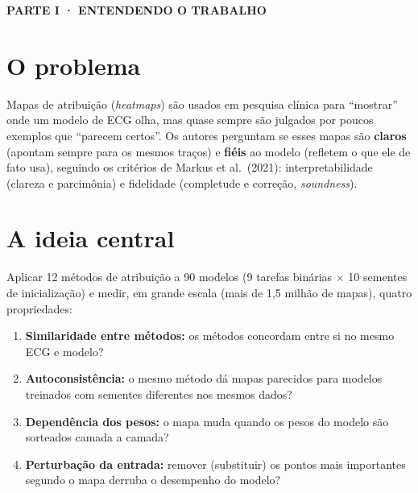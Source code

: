 \documentclass[11pt,a4paper]{article}
\newcommand{\partbar}[1]{\par\vspace{1.2em}\noindent\colorbox{black!80}{\parbox{\dimexpr\linewidth-2\fboxsep}{\color{white}\bfseries\sffamily\MakeUppercase{#1}}}\par\vspace{0.4em}}
\begin{document}
\partbar{Parte I · Entendendo o trabalho}

\section{O problema}
Mapas de atribuição (\textit{heatmaps}) são usados em pesquisa clínica para “mostrar” onde um modelo de ECG olha, mas quase sempre são julgados por poucos exemplos que “parecem certos”. Os autores perguntam se esses mapas são \textbf{claros} (apontam sempre para os mesmos traços) e \textbf{fiéis} ao modelo (refletem o que ele de fato usa), seguindo os critérios de Markus et al.\ (2021): interpretabilidade (clareza e parcimônia) e fidelidade (completude e correção, \textit{soundness}).

\section{A ideia central}
Aplicar 12 métodos de atribuição a 90 modelos (9 tarefas binárias $\times$ 10 sementes de inicialização) e medir, em grande escala (mais de 1,5 milhão de mapas), quatro propriedades:
\begin{enumerate}
\item \textbf{Similaridade entre métodos:} os métodos concordam entre si no mesmo ECG e modelo?
\item \textbf{Autoconsistência:} o mesmo método dá mapas parecidos para modelos treinados com sementes diferentes nos mesmos dados?
\item \textbf{Dependência dos pesos:} o mapa muda quando os pesos do modelo são sorteados camada a camada?
\item \textbf{Perturbação da entrada:} remover (substituir) os pontos mais importantes segundo o mapa derruba o desempenho do modelo?
\end{enumerate}
\end{document}
